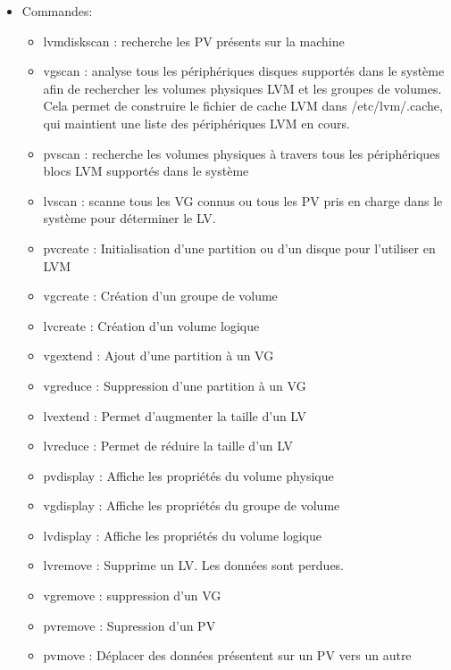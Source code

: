 \documentclass[a4paper]{article}
\begin{document}
\begin{itemize}
\item Commandes:
\begin{itemize}
    \item lvmdiskscan : recherche les PV présents sur la machine
    \item vgscan : analyse tous les périphériques disques supportés dans le système afin de rechercher les volumes physiques LVM et les groupes de volumes. Cela permet de construire le fichier de cache LVM dans /etc/lvm/.cache, qui maintient une liste des périphériques LVM en cours.
    \item pvscan : recherche les volumes physiques à travers tous les périphériques blocs LVM supportés dans le système
    \item lvscan : scanne tous les VG connus ou tous les PV pris en charge dans le système pour déterminer le LV.
    \item pvcreate : Initialisation d’une partition ou d’un disque pour l’utiliser en LVM
    \item vgcreate : Création d’un groupe de volume
    \item lvcreate : Création d’un volume logique
    \item vgextend : Ajout d’une partition à un VG
    \item vgreduce : Suppression d’une partition à un VG
    \item lvextend : Permet d’augmenter la taille d’un LV
    \item lvreduce : Permet de réduire la taille d’un LV
    \item pvdisplay : Affiche les propriétés du volume physique
    \item vgdisplay : Affiche les propriétés du groupe de volume
    \item lvdisplay : Affiche les propriétés du volume logique
    \item lvremove : Supprime un LV. Les données sont perdues.
    \item vgremove : suppression d’un VG
    \item pvremove : Supression d’un PV
    \item pvmove : Déplacer des données présentent sur un PV vers un autre
\end{itemize}

\end{itemize}
\end{document}
